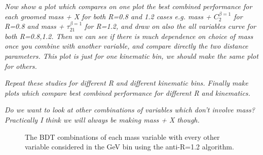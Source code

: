 {\it Now show a plot which compares on one plot the best combined performance for
each groomed mass + X for both R=0.8 and 1.2 cases e.g. mass +
$C_{2}^{\beta=1}$ for R=0.8 and mass + $\tau_{21}^{\beta=1}$ for R=1.2,
  and draw on also the
all variables curve for both R=0.8,1.2. 
Then we can see if there is much dependence on choice of mass once you
combine with another variable, and compare directly the two distance parameters.
This plot is just for
one kinematic bin, we should make the same plot for others.}

{\it Repeat these studies for different R and different kinematic
bins. Finally make plots which compare best combined performance for
different R and kinematics.}

{\it Do we want to look at other combinations of variables which don't
involve mass? Practically I think we will always be making mass + X though.}



\begin{figure}
\begin{center}
\caption{The BDT combinations of each mass variable with every other
variable considered in the  GeV bin using the anti-\kT R=1.2 algorithm.}
\label{fig:pt500_masscomb_AKt_R12}
\end{center}
\end{figure}

